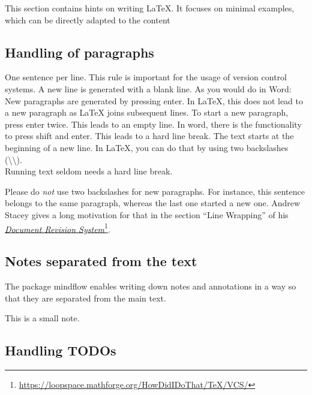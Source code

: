 This section contains hints on writing LaTeX.
It focuses on minimal examples, which can be directly adapted to the content

\subsection{Handling of paragraphs}

\begin{ltgexample}
One sentence per line.
This rule is important for the usage of version control systems.
A new line is generated with a blank line.
As you would do in Word:
New paragraphs are generated by pressing enter.
In LaTeX, this does not lead to a new paragraph as LaTeX joins subsequent lines.
To start a new paragraph, press enter twice.
This leads to an empty line.
In word, there is the functionality to press shift and enter.
This leads to a hard line break.
The text starts at the beginning of a new line.
In LaTeX, you can do that by using two backslashes (\textbackslash\textbackslash).
\\
Running text seldom needs a hard line break.

Please do \textit{not} use two backslashes for new paragraphs.
For instance, this sentence belongs to the same paragraph, whereas the last one started a new one.
Andrew Stacey gives a long motivation for that in the section \enquote{Line Wrapping} of his \href{https://loopspace.mathforge.org/HowDidIDoThat/TeX/VCS/#section.3}{\emph{Document Revision System}}\footnote{\url{https://loopspace.mathforge.org/HowDidIDoThat/TeX/VCS/}}.
\end{ltgexample}

\subsection{Notes separated from the text}

The package mindflow enables writing down notes and annotations in a way so that they are separated from the main text.

\begin{ltgexample}
\begin{mindflow}
This is a small note.
\end{mindflow}
\end{ltgexample}

\subsection{Handling TODOs}

